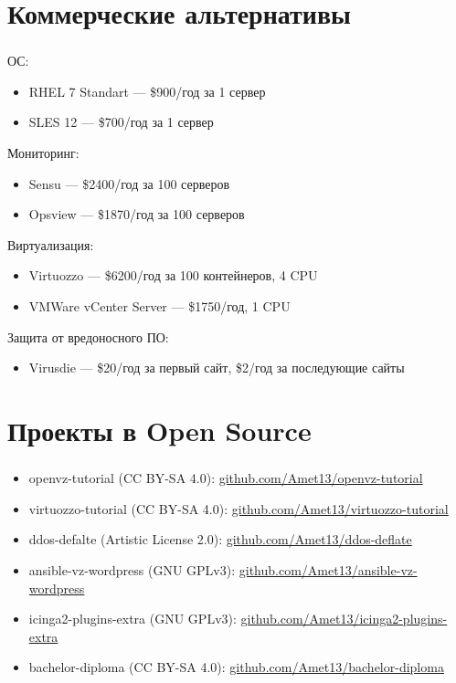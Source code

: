 
\section{Коммерческие альтернативы}

\begin{frame}
\frametitle{\insertsection}
ОС:
\begin{itemize}
	\item RHEL 7 Standart --- \$900/год за 1 сервер
	\item SLES 12 --- \$700/год за 1 сервер
\end{itemize}
Мониторинг:
\begin{itemize}
	\item Sensu --- \$2400/год за 100 серверов
	\item Opsview --- \$1870/год за 100 серверов
\end{itemize}
Виртуализация:
\begin{itemize}
	\item Virtuozzo --- \$6200/год за 100 контейнеров, 4 CPU
	\item VMWare vCenter Server --- \$1750/год, 1 CPU
\end{itemize}
Защита от вредоносного ПО:
\begin{itemize}
	\item Virusdie --- \$20/год за первый сайт, \$2/год за последующие сайты
\end{itemize}
\end{frame}


\section{Проекты в Open Source}

\begin{frame}
\frametitle{\insertsection}
\begin{itemize}
	\item openvz-tutorial (CC BY-SA 4.0): \href{https://github.com/Amet13/openvz-tutorial}{github.com/Amet13/openvz-tutorial}
	\item virtuozzo-tutorial (CC BY-SA 4.0): \href{https://github.com/Amet13/virtuozzo-tutorial}{github.com/Amet13/virtuozzo-tutorial}
	\item ddos-defalte (Artistic License 2.0): \href{https://github.com/Amet13/ddos-deflate}{github.com/Amet13/ddos-deflate}
	\item ansible-vz-wordpress (GNU GPLv3): \href{https://github.com/Amet13/ansible-vz-wordpress}{github.com/Amet13/ansible-vz-wordpress}
	\item icinga2-plugins-extra (GNU GPLv3): \href{https://github.com/Amet13/icinga2-plugins-extra}{github.com/Amet13/icinga2-plugins-extra}
	\item bachelor-diploma (CC BY-SA 4.0): \href{https://github.com/Amet13/bachelor-diploma}{github.com/Amet13/bachelor-diploma}
\end{itemize}
\end{frame}


\frame[plain]{\titlepage} %
